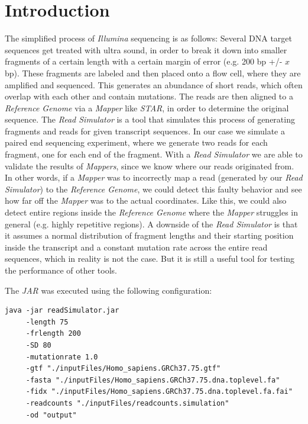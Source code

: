 \documentclass[12pt]{article}
\begin{document}
\section{Introduction}\label{sec:intro}
The simplified process of \textit{Illumina} sequencing is as follows:
Several DNA target sequences get treated with ultra sound,
in order to break it down into smaller fragments of a certain length with a certain margin of error (e.g. 200 bp +/- $x$ bp).
These fragments are labeled and then placed onto a flow cell, where they are amplified and sequenced.
This generates an abundance of short reads, which often overlap with each other and contain mutations.
The reads are then aligned to a \textit{Reference Genome} via a \textit{Mapper} like \textit{STAR}, in order to determine the original sequence.
The \textit{Read Simulator} is a tool that simulates this process of generating fragments and reads for given transcript sequences.
In our case we simulate a paired end sequencing experiment, where we generate two reads for each fragment, one for each end of the fragment.
With a \textit{Read Simulator} we are able to validate the results of \textit{Mappers}, since we know where our reads originated from.
In other words, if a \textit{Mapper} was to incorrectly map a read (generated by our \textit{Read Simulator}) to the \textit{Reference Genome},
we could detect this faulty behavior and see how far off the \textit{Mapper} was to the actual coordinates.
Like this, we could also detect entire regions inside the \textit{Reference Genome} where the \textit{Mapper} struggles in general (e.g. highly repetitive regions).
A downside of the \textit{Read Simulator} is that it assumes a normal distribution of fragment lengths and
their starting position inside the transcript
and a constant mutation rate across the entire read sequences, which in reality is not the case.
But it is still a useful tool for testing the performance of other tools.

The \textit{JAR} was executed using the following configuration:
\begin{verbatim}
java -jar readSimulator.jar 
     -length 75 
     -frlength 200
     -SD 80 
     -mutationrate 1.0 
     -gtf "./inputFiles/Homo_sapiens.GRCh37.75.gtf" 
     -fasta "./inputFiles/Homo_sapiens.GRCh37.75.dna.toplevel.fa" 
     -fidx "./inputFiles/Homo_sapiens.GRCh37.75.dna.toplevel.fa.fai" 
     -readcounts "./inputFiles/readcounts.simulation" 
     -od "output"
    \end{verbatim}
\end{document}
